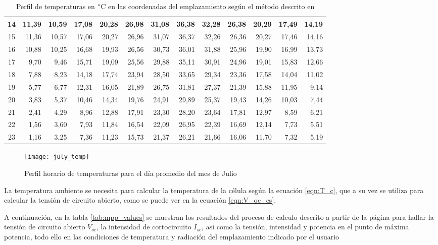 \begin{table}[H]
\begin{tabular}{|c|r|r|r|r|r|r|r|r|r|r|r|r|}
14 & 11,39 & 10,59 & 17,08 & 20,28 & 26,98 & 31,08 & 36,38 & 32,28 & 26,38 & 20,29 & 17,49 & 14,19 \\ \hline
15 & 11,36 & 10,57 & 17,06 & 20,27 & 26,96 & 31,07 & 36,37 & 32,26 & 26,36 & 20,27 & 17,46 & 14,16 \\ \hline
16 & 10,88 & 10,25 & 16,68 & 19,93 & 26,56 & 30,73 & 36,01 & 31,88 & 25,96 & 19,90 & 16,99 & 13,73 \\ \hline
17 & 9,70  & 9,46  & 15,71 & 19,09 & 25,56 & 29,88 & 35,11 & 30,91 & 24,96 & 19,01 & 15,83 & 12,66 \\ \hline
18 & 7,88  & 8,23  & 14,18 & 17,74 & 23,94 & 28,50 & 33,65 & 29,34 & 23,36 & 17,58 & 14,04 & 11,02 \\ \hline
19 & 5,77  & 6,77  & 12,31 & 16,05 & 21,89 & 26,75 & 31,81 & 27,37 & 21,39 & 15,88 & 11,95 & 9,14  \\ \hline
20 & 3,83  & 5,37  & 10,46 & 14,34 & 19,76 & 24,91 & 29,89 & 25,37 & 19,43 & 14,26 & 10,03 & 7,44  \\ \hline
21 & 2,41  & 4,29  & 8,96  & 12,88 & 17,91 & 23,30 & 28,20 & 23,64 & 17,81 & 12,97 & 8,59  & 6,21  \\ \hline
22 & 1,56  & 3,60  & 7,93  & 11,84 & 16,54 & 22,09 & 26,95 & 22,39 & 16,69 & 12,14 & 7,73  & 5,51  \\ \hline
23 & 1,16  & 3,25  & 7,36  & 11,23 & 15,73 & 21,37 & 26,21 & 21,66 & 16,06 & 11,70 & 7,32  & 5,19  \\ \hline
\end{tabular}
\caption{Perfil de temperaturas en $\degree$C en las coordenadas del emplazamiento según el método descrito en \cite{temp_paper} \label{tab:temp_profiles}}
\end{table}

\begin{figure}[H]
\texttt{[image: july\_temp]}
\centering
\caption{Perfil horario de temperaturas para el día promedio del mes de Julio}
\label{fig:temp_min_max}
\end{figure}

La temperatura ambiente se necesita para calcular la temperatura de la célula según la ecuación \ref{eqn:T_c}, que a su vez se utiliza para calcular la tensión de circuito abierto, como se puede ver en la ecuación \ref{eqn:V_oc_cs}.

A continuación, en la tabla \ref{tab:mpp_values} se muestran los resultados del proceso de calculo descrito a partir de la página \pageref{section:var_form_factor} para hallar la tensión de circuito abierto $V_{oc}$, la intensidad de cortocircuito $I_{sc}$, asi como la tensión, intensidad y potencia en el punto de máxima potencia, todo ello en las condiciones de temperatura y radiación del emplazamiento indicado por el usuario
\newpage

